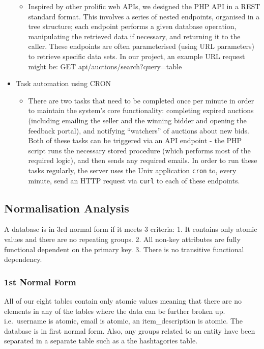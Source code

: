 \begin{itemize}
  \begin{itemize}
  \tightlist
  \item
    Inspired by other prolific web APIs, we designed the PHP API in a
    REST standard format. This involves a series of nested endpoints,
    organised in a tree structure; each endpoint performs a given
    database operation, manipulating the retrieved data if necessary,
    and returning it to the caller. These endpoints are often
    parameterised (using URL parameters) to retrieve specific data sets.
    In our project, an example URL request might be: GET
    api/auctions/search?query=table
  \end{itemize}
\item
  Task automation using CRON

  \begin{itemize}
  \tightlist
  \item
    There are two tasks that need to be completed once per minute in
    order to maintain the system's core functionality: completing
    expired auctions (including emailing the seller and the winning
    bidder and opening the feedback portal), and notifying ``watchers''
    of auctions about new bids. Both of these tasks can be triggered via
    an API endpoint - the PHP script runs the necessary stored procedure
    (which performs most of the required logic), and then sends any
    required emails. In order to run these tasks regularly, the server
    uses the Unix application \texttt{cron} to, every minute, send an
    HTTP request via \texttt{curl} to each of these endpoints.
  \end{itemize}
\end{itemize}

\subsection{Normalisation Analysis}\label{normalisation-analysis}

A database is in 3rd normal form if it meets 3 criteria: 1. It contains
only atomic values and there are no repeating groups. 2. All non-key
attributes are fully functional dependent on the primary key. 3. There
is no transitive functional dependency.

\subsubsection{1st Normal Form}\label{st-normal-form}

All of our eight tables contain only atomic values meaning that there
are no elements in any of the tables where the data can be further
broken up. i.e.~username is atomic, email is atomic, an
item\_description is atomic. The database is in first normal form. Also,
any groups related to an entity have been separated in a separate table
such as a the hashtagories table.

